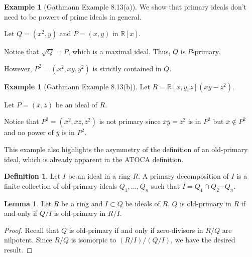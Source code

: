 \documentclass{article}
\theoremstyle{definition}
\newtheorem{definition}{Definition}
\newtheorem{lemma}[theorem]{Lemma}
\newtheorem{example}[theorem]{Example}
\newcommand{\ann}{\operatorname{Ann}}
\begin{document}




\begin{example}[Gathmann Example 8.13(a)]
    We show that primary ideals don't need to be powers of prime ideals in general.

    Let $ Q = (x^{2}, y) $ and $ P = (x,y) $ in $ \mathbb{R}[x] $.

    Notice that $ \sqrt{Q} = P $, which is a maximal ideal. Thus, $ Q $ is $ P $-primary.
    
    However, $ P^{2} = (x^{2}, xy, y^{2}) $ is strictly contained in $ Q $.
\end{example}

\begin{example}[Gathmann Example 8.13(b)]
    Let $ R = \mathbb{R}[x,y,z](xy - z^{2}) $.

    Let $ P = (\bar{x}, \bar{z}) $ be an ideal of $ R $.



    Notice that $ P^{2} = (\bar{x}^{2}, \bar{x} \bar{z}, \bar{z}^{2}) $ is not primary since
    $ \bar{x}\bar{y} = \bar{z}^{2} $ is in $ P^{2} $ but $ \bar{x} \notin P^{2} $ and no power
    of $ \bar{y} $ is in $ P^{2} $.

    This example also highlights the asymmetry of the definition of an old-primary ideal,
    which is already apparent in the ATOCA definition.
\end{example}

\begin{definition}
    Let $ I $ be an ideal in a ring $ R $.
    A primary decomposition of $ I $ is a finite collection of old-primary ideals $ Q_{1}, \ldots, Q_{n} $
    such that $ I = Q_{1} \cap Q_{2} \cdots Q_{n} $.
\end{definition}

\begin{lemma}
    Let $ R $ be a ring and $ I \subset Q $ be ideals of $ R $.
    $ Q $ is old-primary in $ R $ if and only if $ Q/I $ is old-primary in $ R/I $.
\end{lemma}
\begin{proof}
    Recall that $ Q $ is old-primary if and only if zero-divisors in $ R/Q $
    are nilpotent. Since $ R/Q $ is isomorpic to $ (R/I) / (Q/I) $, we have
    the desired result.
\end{proof}
\end{document}
